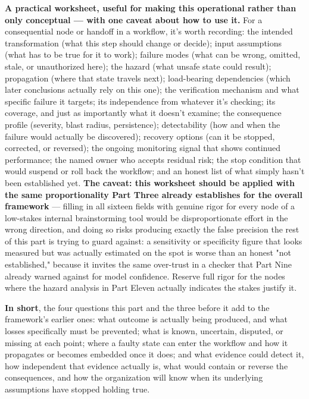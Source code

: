 \textbf{A practical worksheet, useful for making this operational rather than only conceptual --- with one caveat about how to use it.} For a consequential node or handoff in a workflow, it's worth recording: the intended transformation (what this step should change or decide); input assumptions (what has to be true for it to work); failure modes (what can be wrong, omitted, stale, or unauthorized here); the hazard (what unsafe state could result); propagation (where that state travels next); load-bearing dependencies (which later conclusions actually rely on this one); the verification mechanism and what specific failure it targets; its independence from whatever it's checking; its coverage, and just as importantly what it doesn't examine; the consequence profile (severity, blast radius, persistence); detectability (how and when the failure would actually be discovered); recovery options (can it be stopped, corrected, or reversed); the ongoing monitoring signal that shows continued performance; the named owner who accepts residual risk; the stop condition that would suspend or roll back the workflow; and an honest list of what simply hasn't been established yet. \textbf{The caveat: this worksheet should be applied with the same proportionality Part Three already establishes for the overall framework} --- filling in all sixteen fields with genuine rigor for every node of a low-stakes internal brainstorming tool would be disproportionate effort in the wrong direction, and doing so risks producing exactly the false precision the rest of this part is trying to guard against: a sensitivity or specificity figure that looks measured but was actually estimated on the spot is worse than an honest "not established," because it invites the same over-trust in a checker that Part Nine already warned against for model confidence. Reserve full rigor for the nodes where the hazard analysis in Part Eleven actually indicates the stakes justify it.

\textbf{In short}, the four questions this part and the three before it add to the framework's earlier ones: what outcome is actually being produced, and what losses specifically must be prevented; what is known, uncertain, disputed, or missing at each point; where a faulty state can enter the workflow and how it propagates or becomes embedded once it does; and what evidence could detect it, how independent that evidence actually is, what would contain or reverse the consequences, and how the organization will know when its underlying assumptions have stopped holding true.
